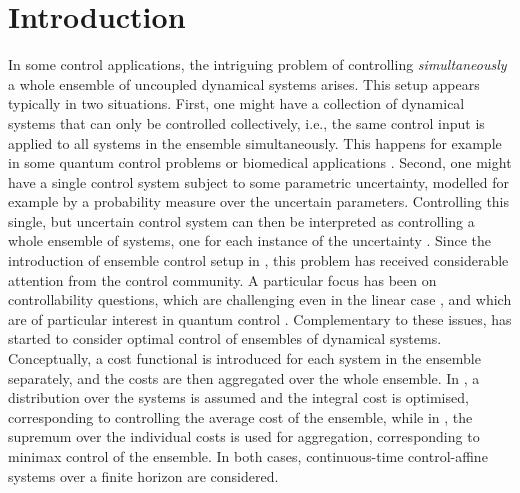\documentclass[letterpaper, 10 pt, conference]{IEEEconf}  %
\theoremstyle{theorem}
\theoremstyle{definition}
\theoremstyle{remark}
\begin{document}
\section{Introduction} \label{sec:intro}
In some control applications, the intriguing problem of controlling \emph{simultaneously} a whole ensemble of uncoupled dynamical systems arises.
This setup appears typically in two situations. 
First, one might have a collection of dynamical systems that can only be controlled collectively, i.e., the same control input is applied to all systems in the ensemble simultaneously. This happens for example in some quantum control problems \cite{li2006control,ruths2012optimal} or biomedical applications \cite{scagliotti2025ensemble}.
Second, one might have a single control system subject to some parametric uncertainty, modelled for example by a probability measure over the uncertain parameters.
Controlling this single, but uncertain control system can then be interpreted as controlling a whole ensemble of systems, one for each instance of the uncertainty \cite{Ross2015Riemann,Caillau2018Solving}.
Since the introduction of ensemble control setup in \cite{Li2009Ensemble}, this problem has received considerable attention from the control community.
A particular focus has been on controllability questions, which are challenging even in the linear case \cite{Loheac2016From,Baparou2024Conditions}, and which are of particular interest in quantum control \cite{Augier2018Adiabatic}.
Complementary to these issues, \cite{scagliotti2023optimal} has started to consider optimal control of ensembles of dynamical systems.
Conceptually, a cost functional is introduced for each system in the ensemble separately, and the costs are then aggregated over the whole ensemble.
In \cite{scagliotti2023optimal}, a distribution over the systems is assumed and the integral cost is optimised, corresponding to controlling the average cost of the ensemble, 
while in \cite{scagliotti2025minimax}, the supremum over the individual costs is used for aggregation, corresponding to minimax control of the ensemble.
In both cases, continuous-time control-affine systems over a finite horizon are considered.
\end{document}
